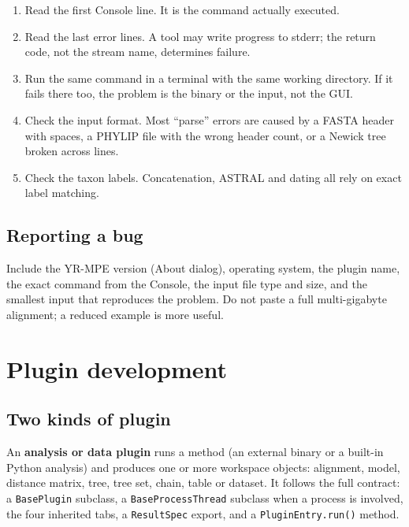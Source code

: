 \documentclass[10pt]{report}
\begin{document}
\begin{enumerate}
  \item Read the first Console line. It is the command actually executed.
  \item Read the last error lines. A tool may write progress to stderr; the
        return code, not the stream name, determines failure.
  \item Run the same command in a terminal with the same working directory. If
        it fails there too, the problem is the binary or the input, not the
        GUI.
  \item Check the input format. Most ``parse'' errors are caused by a FASTA
        header with spaces, a PHYLIP file with the wrong header count, or a
        Newick tree broken across lines.
  \item Check the taxon labels. Concatenation, ASTRAL and dating all rely on
        exact label matching.
\end{enumerate}

\section{Reporting a bug}

Include the YR-MPE version (About dialog), operating system, the plugin name,
the exact command from the Console, the input file type and size, and the
smallest input that reproduces the problem. Do not paste a full multi-gigabyte
alignment; a reduced example is more useful.

\chapter{Plugin development}

\section{Two kinds of plugin}

An \textbf{analysis or data plugin} runs a method (an external binary or a
built-in Python analysis) and produces one or more workspace objects:
alignment, model, distance matrix, tree, tree set, chain, table or dataset.
It follows the full contract: a \texttt{BasePlugin} subclass, a
\texttt{BaseProcessThread} subclass when a process is involved, the four
inherited tabs, a \texttt{ResultSpec} export, and a \texttt{PluginEntry.run()}
method.
\end{document}
